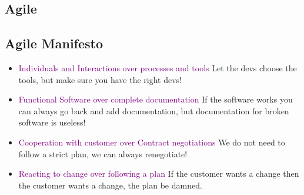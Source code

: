 \documentclass[main.tex,fontsize=12pt,paper=a4,paper=landscape,DIV=calc,]{scrartcl}
\begin{document}
\begin{multicols*}{2}
\section{Agile}
\subsection{Agile Manifesto}
\begin{itemize}
\item \textcolor{purple}{Individuals and Interactions over processes and tools}\newline
  Let the devs choose the tools, but make sure you have the right devs!
\item \textcolor{purple}{Functional Software over complete documentation}\newline
  If the software works you can always go back and add documentation, but documentation for broken software is useless!
\item \textcolor{purple}{Cooperation with customer over Contract negotiations}\newline
  We do not need to follow a strict plan, we can always renegotiate!
\item \textcolor{purple}{Reacting to change over following a plan}\newline
  If the customer wants a change then the customer wants a change, the plan be damned. 
\end{itemize} 


\end{multicols*}
\end{document}
